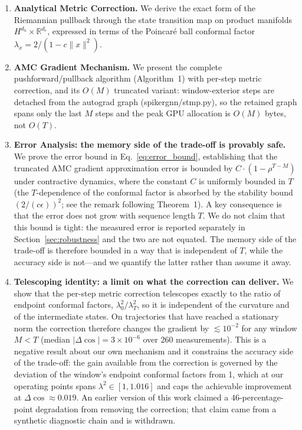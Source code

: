 \documentclass[a4paper,fleqn]{cas-dc}
\begin{document}
\begin{enumerate}
    \item \textbf{Analytical Metric Correction.} We derive the exact form of the Riemannian pullback through the state transition map on product manifolds $H^{d_h} \times \mathbb{R}^{d_e}$, expressed in terms of the Poincar\'e ball conformal factor $\lambda_x = 2/(1-c\|x\|^2)$.
    
    \item \textbf{AMC Gradient Mechanism.} We present the complete pushforward/pullback algorithm (Algorithm~1) with per-step metric correction, and its $O(M)$ truncated variant: window-exterior steps are detached from the autograd graph (spikergnn/stmp.py), so the retained graph spans only the last $M$ steps and the peak GPU allocation is $O(M)$ bytes, not $O(T)$.
    
    \item \textbf{Error Analysis: the memory side of the trade-off is provably safe.} We prove the error bound in Eq.~\eqref{eq:error_bound}, establishing that the truncated AMC gradient approximation error is bounded by $C \cdot (1-\rho^{T-M})$ under contractive dynamics, where the constant $C$ is uniformly bounded in $T$ (the $T$-dependence of the conformal factor is absorbed by the stability bound $(2/(c\epsilon))^2$; see the remark following Theorem~1). A key consequence is that the error does not grow with sequence length $T$. We do not claim that this bound is tight: the measured error is reported separately in Section~\ref{sec:robustness} and the two are not equated. The memory side of the trade-off is therefore bounded in a way that is independent of $T$, while the accuracy side is not---and we quantify the latter rather than assume it away.
    
    \item \textbf{Telescoping identity: a limit on what the correction can deliver.} We show that the per-step metric correction telescopes exactly to the ratio of endpoint conformal factors, $\lambda_0^2/\lambda_T^2$, so it is independent of the curvature and of the intermediate states. On trajectories that have reached a stationary norm the correction therefore changes the gradient by $\lesssim10^{-2}$ for any window $M<T$ (median $|\Delta\cos| = 3\times10^{-6}$ over 260 measurements). This is a negative result about our own mechanism and it constrains the accuracy side of the trade-off: the gain available from the correction is governed by the deviation of the window's endpoint conformal factors from 1, which at our operating points spans $\lambda^2 \in [1, 1.016]$ and caps the achievable improvement at $\Delta\cos \approx 0.019$. An earlier version of this work claimed a 46-percentage-point degradation from removing the correction; that claim came from a synthetic diagnostic chain and is withdrawn.
    

\end{enumerate}
\end{document}
